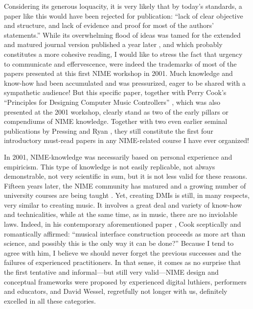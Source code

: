 Considering its generous loquacity, it is very likely that by today's standards, a paper like this would have been rejected for publication: ``lack of clear objective and structure, and lack of evidence and proof for most of the authors' statements.'' While its overwhelming flood of ideas was tamed for the extended and matured journal version published a year later \cite{Wessel:2002}, and which probably constitutes a more cohesive reading, I would like to stress the fact that urgency to communicate and effervescence, were indeed the trademarks of most of the papers presented at this first NIME workshop in 2001. Much knowledge and know-how had been accumulated and was pressurized, eager to be shared with a sympathetic audience! But this specific paper, together with Perry Cook's ``Principles for Designing Computer Music Controllers'' \cite{Cook:2001}, which was also presented at the 2001 workshop, clearly stand as two of the early pillars or compendiums of NIME knowledge. Together with two even earlier seminal publications by Pressing \cite{Pressing:1990} and Ryan \cite{Ryan:1992}, they still constitute the first four introductory must-read papers in any NIME-related course I have ever organized!

In 2001, NIME-knowledge was necessarily based on personal experience and empiricism. This type of knowledge is not easily replicable, not always demonstrable, not very scientific in sum, but it is not less valid for these reasons. Fifteen years later, the NIME community has matured and a growing number of university courses are being taught \cite{Jorda:2014}. Yet, creating DMIs is still, in many respects, very similar to creating music. It involves a great deal and variety of know-how and technicalities, while at the same time, as in music, there are no inviolable laws.  Indeed, in his contemporary aforementioned paper \cite{Cook:2001}, Cook sceptically and romantically affirmed: ``musical interface construction proceeds as more art than science, and possibly this is the only way it can be done?'' Because I tend to agree with him, I believe we should never forget the previous successes and the failures of experienced practitioners. In that sense, it comes as no surprise that the first tentative and informal---but still very valid---NIME design and conceptual frameworks were proposed by experienced digital luthiers, performers and educators, and David Wessel, regretfully not longer with us, definitely excelled in all these categories.
